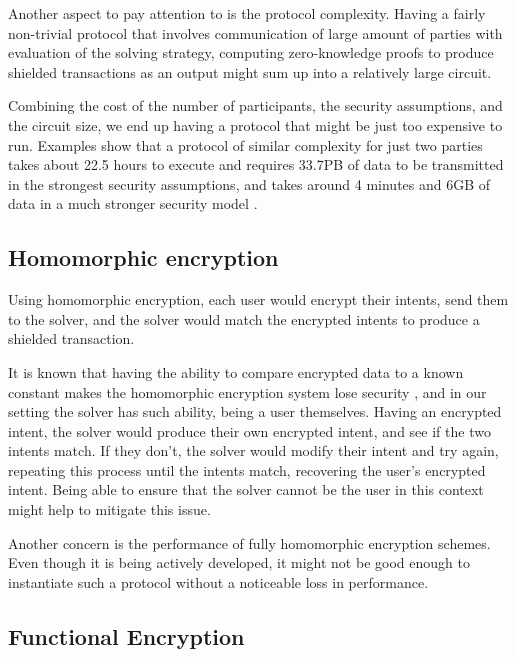 \documentclass[final]{msc}
\begin{document}
\hfill

Another aspect to pay attention to is the protocol complexity. Having a fairly non-trivial protocol that involves communication of large amount of parties with evaluation of the solving strategy, computing zero-knowledge proofs to produce shielded transactions as an output might sum up into a relatively large circuit.

\hfill

Combining the cost of the number of participants, the security assumptions, and the circuit size, we end up having a protocol that might be just too expensive to run. Examples show that a protocol of similar complexity for just two parties takes about 22.5 hours to execute and requires 33.7PB of data to be transmitted in the strongest security assumptions, and takes around 4 minutes and 6GB of data in a much stronger security model \cite{flash}.

\subsection{Homomorphic encryption}

Using homomorphic encryption, each user would encrypt their intents, send them to the solver, and the solver would match the encrypted intents to produce a shielded transaction.

\hfill

It is known that having the ability to compare encrypted data to a known constant makes the homomorphic encryption system lose security \cite{databanks}, and in our setting the solver has such ability, being a user themselves. Having an encrypted intent, the solver would produce their own encrypted intent, and see if the two intents match. If they don't, the solver would modify their intent and try again, repeating this process until the intents match, recovering the user's encrypted intent. Being able to ensure that the solver cannot be the user in this context might help to mitigate this issue.

\hfill

Another concern is the performance of fully homomorphic encryption schemes. Even though it is being actively developed, it might not be good enough to instantiate such a protocol without a noticeable loss in performance.

\subsection{Functional Encryption}
\end{document}
